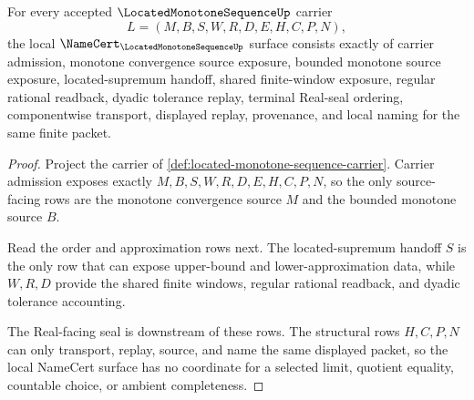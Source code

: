 \begin{theorem}
\label{thm:located-monotone-sequence-namecert-obligations}
For every accepted $\LocatedMonotoneSequenceUp$ carrier
$$
L=(M,B,S,W,R,D,E,H,C,P,N),
$$
the local $\NameCert_{\LocatedMonotoneSequenceUp}$ surface consists exactly of carrier admission, monotone convergence source exposure, bounded monotone source exposure, located-supremum handoff, shared finite-window exposure, regular rational readback, dyadic tolerance replay, terminal Real-seal ordering, componentwise transport, displayed replay, provenance, and local naming for the same finite packet.
\end{theorem}
\begin{proof}
Project the carrier of \autoref{def:located-monotone-sequence-carrier}. Carrier admission exposes exactly $M,B,S,W,R,D,E,H,C,P,N$, so the only source-facing rows are the monotone convergence source $M$ and the bounded monotone source $B$.

Read the order and approximation rows next. The located-supremum handoff $S$ is the only row that can expose upper-bound and lower-approximation data, while $W,R,D$ provide the shared finite windows, regular rational readback, and dyadic tolerance accounting.

The Real-facing seal is downstream of these rows. The structural rows $H,C,P,N$ can only transport, replay, source, and name the same displayed packet, so the local NameCert surface has no coordinate for a selected limit, quotient equality, countable choice, or ambient completeness.
\end{proof}

